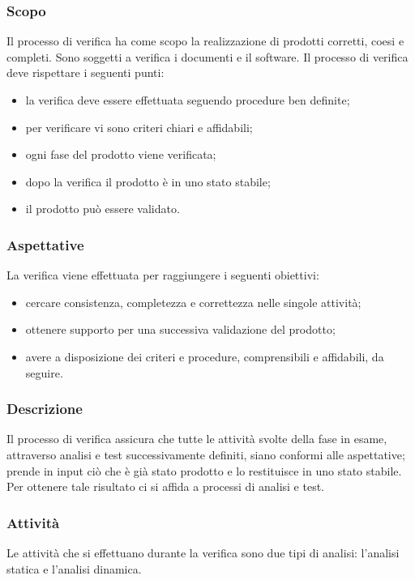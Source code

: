 \subsubsection{Scopo}
Il processo di verifica ha come scopo la realizzazione di prodotti corretti, coesi e completi. Sono soggetti a verifica i documenti e il software.
Il processo di verifica deve rispettare i seguenti punti: \begin{itemize}
\item la verifica deve essere effettuata seguendo procedure ben definite;
\item per verificare vi sono criteri chiari e affidabili;
\item ogni fase del prodotto viene verificata;
\item dopo la verifica il prodotto è in uno stato stabile;
\item il prodotto può essere validato.
\end{itemize}

\subsubsection{Aspettative}
La verifica viene effettuata per raggiungere i seguenti obiettivi: \begin{itemize}
\item cercare consistenza, completezza e correttezza nelle singole attività;
\item ottenere supporto per una successiva validazione del prodotto;
\item avere a disposizione dei criteri e procedure, comprensibili e affidabili, da seguire.
\end{itemize}

\subsubsection{Descrizione}
Il processo di verifica assicura che tutte le attività svolte della fase in esame, attraverso analisi e test successivamente definiti, siano conformi alle aspettative; prende in input ciò che è già stato prodotto e lo restituisce in uno stato stabile. \\
Per ottenere tale risultato ci si affida a processi di analisi e test.

\subsubsection{Attività}
Le attività che si effettuano durante la verifica sono due tipi di analisi: l’analisi statica e l’analisi dinamica.


